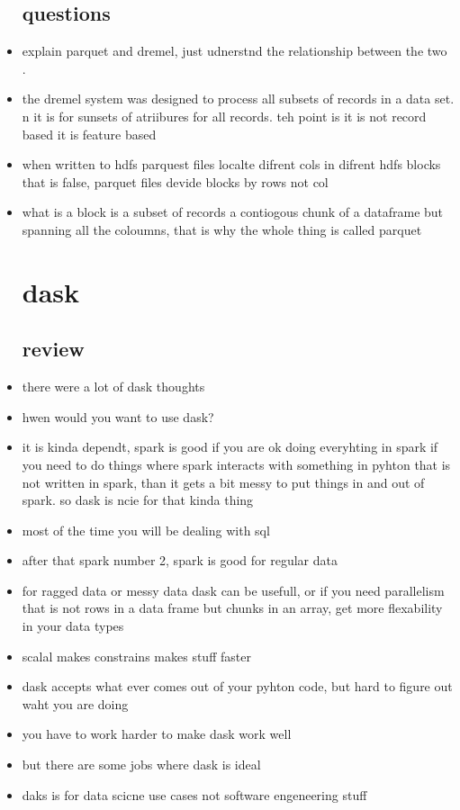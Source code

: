 \documentclass{article}
\begin{document}
\begin{itemize}
\subsection*{questions}
\item explain parquet and dremel, just udnerstnd the relationship between the two . 
\item the dremel system was designed to process all subsets of records in a data set. n it is for sunsets of atriibures for all records. teh point is it is not record based it is feature based 
\item when written to hdfs parquest files localte difrent cols in difrent hdfs blocks that is false, parquet files devide blocks by rows not col 
\item what is a block is a subset of records a contiogous chunk of a dataframe but spanning all the coloumns, that is why the whole thing is called parquet 
\section*{dask}
\subsection*{review}
\item there were a lot of dask thoughts 
\item hwen would you want to use dask?
\item it is kinda dependt, spark is good if you are ok doing everyhting in spark if you need to do things where spark interacts with something in pyhton that is not written in spark, than it gets a bit messy to put things in and out of spark. so dask is ncie for that kinda thing
\item most of the time you will be dealing with sql 
\item after that spark number 2, spark is good for regular data 
\item for ragged data or messy data dask can be usefull, or if you need parallelism that is not rows in a data frame but chunks in an array, get more flexability in your data types 
\item scalal makes constrains makes stuff faster
\item dask accepts what ever comes out of your pyhton code, but hard to figure out waht you are doing 
\item you have to work harder to make dask work well
\item but there are some jobs where dask is ideal
\item daks is for data scicne use cases not software engeneering stuff

\end{itemize}
\end{document}
